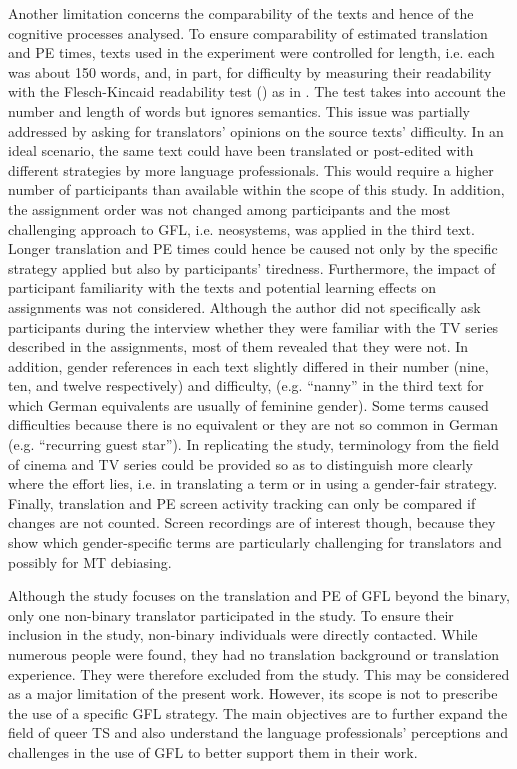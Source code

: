 Another limitation concerns the comparability of the texts and hence of the cognitive processes analysed. To ensure comparability of estimated translation and PE times, texts used in the experiment were controlled for length, i.e. each was about 150 words, and, in part, for difficulty by measuring their readability with the Flesch-Kincaid readability test (\cite{kincaid1975derivation}) as in \textcite{lopez2016can}. The test takes into account the number and length of words but ignores semantics. This issue was partially addressed by asking for translators' opinions on the source texts' difficulty. In an ideal scenario, the same text could have been translated or post-edited with different strategies by more language professionals. This would require a higher number of participants than available within the scope of this study. In addition, the assignment order was not changed among participants and the most challenging approach to GFL, i.e. neosystems, was applied in the third text. Longer translation and PE times could hence be caused not only by the specific strategy applied but also by participants' tiredness. Furthermore, the impact of participant familiarity with the texts and potential learning effects on assignments was not considered. Although the author did not specifically ask participants during the interview whether they were familiar with the TV series described in the assignments, most of them revealed that they were not. In addition, gender references in each text slightly differed in their number (nine, ten, and twelve respectively) and difficulty, (e.g. ``nanny'' in the third text for which German equivalents are usually of feminine gender). Some terms caused difficulties because there is no equivalent or they are not so common in German (e.g. ``recurring guest star''). In replicating the study, terminology from the field of cinema and TV series could be provided so as to distinguish more clearly where the effort lies, i.e. in translating a term or in using a gender-fair strategy. Finally, translation and PE screen activity tracking can only be compared if changes are not counted. Screen recordings are of interest though, because they show which gender-specific terms are particularly challenging for translators and possibly for MT debiasing.

Although the study focuses on the translation and PE of GFL beyond the binary, only one non-binary translator participated in the study. To ensure their inclusion in the study, non-binary individuals were directly contacted. While numerous people were found, they had no translation background or translation experience. They were therefore excluded from the study. This may be considered as a major limitation of the present work. However, its scope is not to prescribe the use of a specific GFL strategy. The main objectives are to further expand the field of queer TS and also understand the language professionals' perceptions and challenges in the use of GFL to better support them in their work. 

